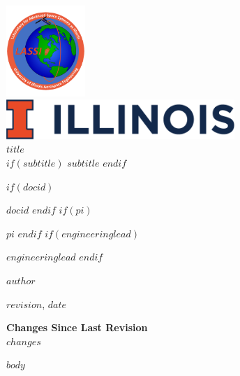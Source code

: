 \documentclass[12pt, twoside]{article}
\title{}
\author{}
\begin{document}
\thispagestyle{empty}
\begin{center}
	\includegraphics[width=3cm]{lassi-logo.jpg}\\
	\includegraphics[height=1.5cm]{Illinois-Wordmark-Horizontal-Full-Color-RGB.png}\\
	\vspace{10mm}
	{\huge \textbf{$title$}}\\
	\vspace{2.5mm}
	$if(subtitle)$
	{\Large $subtitle$}
	$endif$
\end{center}
\vspace{12mm}
\large{
\begin{description}
	$if(docid)$
	\item [Document ID] $docid$
	$endif$
	$if(pi)$
	\item [Principal Investigator] $pi$
	$endif$
	$if(engineeringlead)$
	\item [Engineering Lead] $engineeringlead$
	$endif$
	\item [Document Maintainer] $author$
	\item [Revision] $revision$, $date$
\end{description}
\textbf{Changes Since Last Revision}\\
$changes$
}
\newpage
$body$
\end{document}
